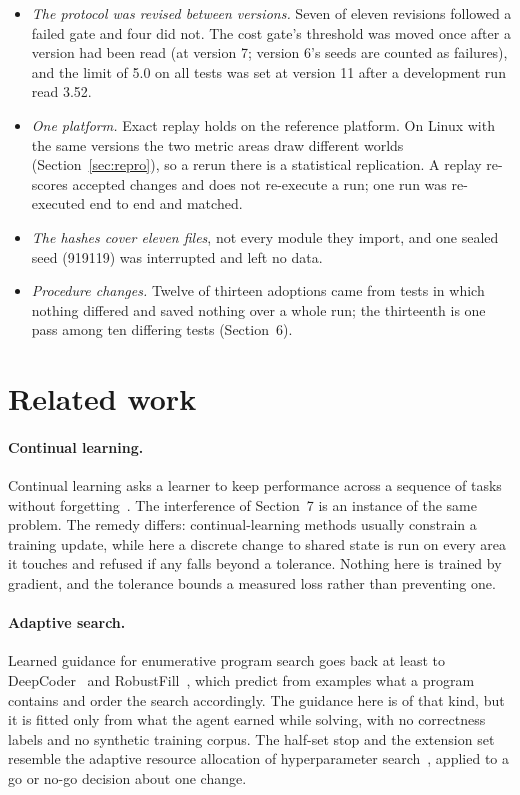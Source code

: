 \documentclass[11pt]{article}
\begin{document}
\begin{itemize}[leftmargin=*]
\item \emph{The protocol was revised between versions.} Seven of eleven revisions followed a failed gate and four did not. The cost gate's threshold was moved once after a version had been read (at version 7; version 6's seeds are counted as failures), and the limit of 5.0 on all tests was set at version 11 after a development run read 3.52.
\item \emph{One platform.} Exact replay holds on the reference platform. On Linux with the same versions the two metric areas draw different worlds (Section~\ref{sec:repro}), so a rerun there is a statistical replication. A replay re-scores accepted changes and does not re-execute a run; one run was re-executed end to end and matched.
\item \emph{The hashes cover eleven files}, not every module they import, and one sealed seed (919119) was interrupted and left no data.
\item \emph{Procedure changes.} Twelve of thirteen adoptions came from tests in which nothing differed and saved nothing over a whole run; the thirteenth is one pass among ten differing tests (Section~6).
\end{itemize}

\section{Related work}

\paragraph{Continual learning.} Continual learning asks a learner to keep performance across a sequence of tasks without forgetting~\cite{parisi2019,kirkpatrick2017}. The interference of Section~7 is an instance of the same problem. The remedy differs: continual-learning methods usually constrain a training update, while here a discrete change to shared state is run on every area it touches and refused if any falls beyond a tolerance. Nothing here is trained by gradient, and the tolerance bounds a measured loss rather than preventing one.

\paragraph{Adaptive search.} Learned guidance for enumerative program search goes back at least to DeepCoder~\cite{balog2017} and RobustFill~\cite{devlin2017}, which predict from examples what a program contains and order the search accordingly. The guidance here is of that kind, but it is fitted only from what the agent earned while solving, with no correctness labels and no synthetic training corpus. The half-set stop and the extension set resemble the adaptive resource allocation of hyperparameter search~\cite{li2018}, applied to a go or no-go decision about one change.
\end{document}
